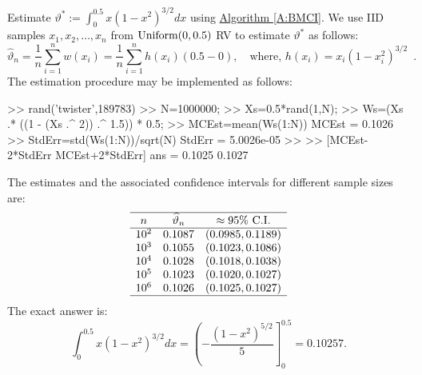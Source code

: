 \begin{labwork}\label{LW:1DintegralOverInterval}
Estimate $\vartheta^* := \int^{0.5}_0x(1-x^2)^{3/2}dx$ using \hyperref[A:BMCI]{Algorithm \ref*{A:BMCI}}.  We use IID samples $x_1,x_2,\ldots,x_n$ from $\mbox{{\rm Uniform}}(0,0.5)$ RV to estimate $\vartheta^*$ as follows:
\[
\widehat{\vartheta}_n = \frac{1}{n} \sum_{i=1}^n w(x_i) = \frac{1}{n} \sum_{i=1}^n h(x_i) (0.5-0), \quad \text{where, } h(x_i)= x_i(1-x_i^2)^{3/2} \enspace .
\]
The estimation procedure may be implemented as follows:
\begin{VrbM}
>> rand('twister',189783)%
>> N=1000000; %
>> Xs=0.5*rand(1,N); %
>> Ws=(Xs .* ((1 - (Xs .^ 2)) .^ 1.5)) * 0.5; %
>> MCEst=mean(Ws(1:N)) %
MCEst =    0.1026
>> StdErr=std(Ws(1:N))/sqrt(N) %
StdErr =   5.0026e-05
>> %
>> [MCEst-2*StdErr MCEst+2*StdErr]
ans =
    0.1025    0.1027
\end{VrbM}

The estimates and the associated confidence intervals for different sample sizes  are:
$$
\begin{array}{ccc}
\hline
n		&\widehat{\vartheta}_n		&\approx 95\%\textrm{~C.I.}\\ \hline
10^2&		0.1087			&	(0.0985, 0.1189)\\
10^3	&		0.1055			&	(0.1023, 0.1086)\\
10^4	&		0.1028			&	(0.1018, 0.1038)\\
10^5	&		0.1023			&	(0.1020, 0.1027)\\
10^6	&		0.1026			&	(0.1025, 0.1027)\\ \hline
\end{array}
$$
The exact answer is:
$$\int^{0.5}_0x(1-x^2)^{3/2}dx=\left( -\frac{(1-x^2)^{5/2}}{5} \right]^{0.5}_0=0.10257.$$
\end{labwork}

